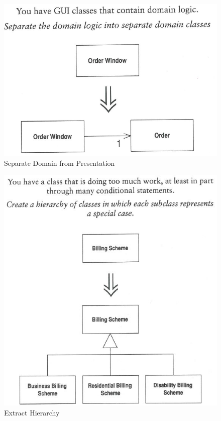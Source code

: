 \begin{figure}[h!]
	\centering
	\includegraphics[width=0.7\linewidth]{fig/separate-domain-from-presentation}
	\caption{Separate Domain from Presentation}
	\label{fig:separate-domain-from-presentation}
\end{figure}

\begin{figure}[h!]
	\centering
	\includegraphics[width=0.7\linewidth]{fig/extract-hierarchy}
	\caption{Extract Hierarchy}
	\label{fig:extract-hierarchy}
\end{figure}

